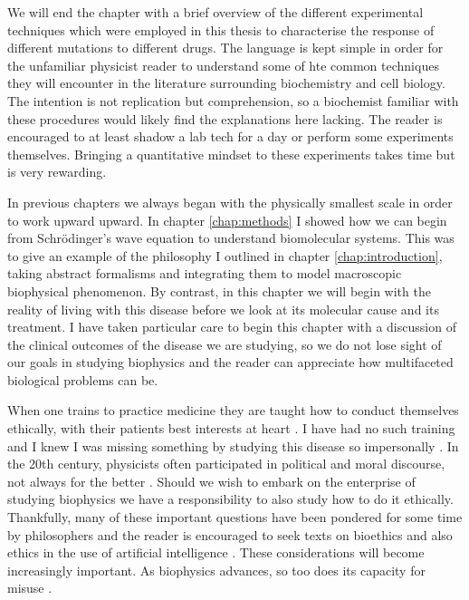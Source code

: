 We will end the chapter with a brief overview of the different experimental techniques which were employed in this thesis to characterise the response of different mutations to different drugs. The language is kept simple in order for the unfamiliar physicist reader to understand some of hte common techniques they will encounter in the literature surrounding biochemistry and cell biology. The intention is not replication but comprehension, so a biochemist familiar with these procedures would likely find the explanations here lacking. The reader is encouraged to at least shadow a lab tech for a day or perform some experiments themselves. Bringing a quantitative mindset to these experiments takes time but is very rewarding.

In previous chapters we always began with the physically smallest scale in order to work upward upward. In chapter \ref{chap:methods} I showed how we can begin from Schr\"odinger's wave equation to understand biomolecular systems. This was to give an example of the philosophy I outlined in chapter \ref{chap:introduction}, taking abstract formalisms and integrating them to model macroscopic biophysical phenomenon. By contrast, in this chapter we will begin with the reality of living with this disease before we look at its molecular cause and its treatment. I have taken particular care to begin this chapter with a discussion of the clinical outcomes of the disease we are studying, so we do not lose sight of our goals in studying biophysics and the reader can appreciate how multifaceted biological problems can be. 

When one trains to practice medicine they are taught how to conduct themselves ethically, with their patients best interests at heart \cite{hajar2017}. I have had no such training and I knew I was missing something by studying this disease so impersonally \cite{foucault1994}. In the 20th century, physicists often participated in political and moral discourse, not always for the better \cite{frank1993, gottfried1999, global2009, rhodes1986, aaronson2008, berger2016, vonneumann_britanica}. Should we wish to embark on the enterprise of studying biophysics we have a responsibility to also study how to do it ethically. Thankfully, many of these important questions have been pondered for some time by philosophers and the reader is encouraged to seek texts on bioethics and also ethics in the use of artificial intelligence \cite{buchanan2000, taneri2011, genome_editting_guildelines_2017, muller2021, bostrom2014}. These considerations will become increasingly important. As biophysics advances, so too does its capacity for misuse \cite{mallapaty2022, urbina2022}. 

